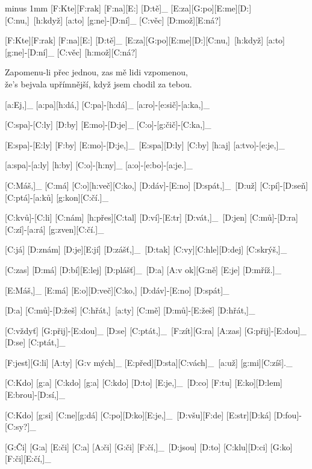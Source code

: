 {\minw=3.5mm
\pskip=3mm minus 1mm
[F:Kte][F:rak] [F:na][E:] [D:tě]_ [E:za][G:po][E:me][D:][C:nu,]\
[h:když] [a:to] [g:ne]-[D:ní]_ [C:věc] [D:mož][E:ná?]\

[F:Kte][F:rak] [F:na][E:] [D:tě]_ [E:za][G:po][E:me][D:][C:nu,]\
[h:když] [a:to] [g:ne]-[D:ní]_ [C:věc] [h:mož][C:ná?]\
}

Zapomenu-li přec jednou, zas mě lidi vzpomenou,\\
že's bejvala upřímnější, když jsem chodil za tebou.



[a:Ej,]_ [a:pa][h:dá,] [C:pa]-[h:dá]_ [a:ro]-[e:sič]-[a:ka,]_\

[C:spa]-[C:ly] [D:by] [E:mo]-[D:je]_ [C:o]-[g:čič]-[C:ka,]_\

[E:spa]-[E:ly] [F:by] [E:mo]-[D:je,]_\
[E:spa][D:ly] [C:by] [h:aj] [a:tvo]-[e:je,]_\

[a:spa]-[a:ly] [h:by] [C:o]-[h:ny]_ [a:o]-[e:bo]-[a:je.]_\



[C:Máš,]_ [C:má] [C:o][h:več][C:ko,] [D:dáv]-[E:no] [D:spát,]_\
[D:už] [C:pí]-[D:seň] [C:ptá]-[a:ků] [g:kon][C:čí.]_\

[C:kvů]-[C:li] [C:nám] [h:přes][C:tal] [D:ví]-[E:tr] [D:vát,]_\
[D:jen] [C:mů]-[D:ra] [C:zí]-[a:rá] [g:zven][C:čí.]_\

[C:já] [D:znám] [D:je][E:jí] [D:zášť,]_\
[D:tak] [C:vy][C:hle][D:dej] [C:skrýš,]_\

[C:zas] [D:má] [D:bí][E:lej] [D:plášť]_\
[D:a] [A:v ok][G:ně] [E:je] [D:mříž.]_\

[E:Máš,]_ [E:má] [E:o][D:več][C:ko,] [D:dáv]-[E:no] [D:spát]_\

[D:a] [C:mů]-[D:žeš] [C:hřát,]\
[a:ty] [C:mě] [D:mů]-[E:žeš] [D:hřát,]_\

[C:vždyť] [G:přij]-[E:dou]_ [D:se] [C:ptát,]_\
[F:zít][G:ra] [A:zas] [G:přij]-[E:dou]_ [D:se] [C:ptát,]_\

[F:jest][G:li] [A:ty] [G:v mých]_ [E:před][D:sta][C:vách]_\
[a:už] [g:mi][C:zíš]._\



[C:Kdo] [g:a] [C:kdo] [g:a] [C:kdo] [D:to] [E:je,]_\
[D:co] [F:tu] [E:ko][D:lem] [E:brou]-[D:sí,]_\

[C:Kdo] [g:si] [C:ne][g:dá] [C:po][D:ko][E:je,]_\
[D:všu][F:de] [E:str][D:ká] [D:fou]-[C:sy?]_\

[G:Či] [G:a] [E:či] [C:a] [A:či] [G:či] [F:čí,]_\
[D:jsou] [D:to] [C:klu][D:ci] [G:ko][F:či][E:čí,]_\

